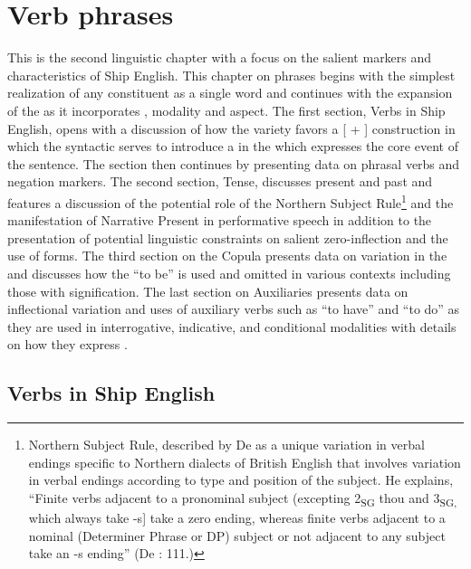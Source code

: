 \chapter{{Verb} {phrases}}

This is the second linguistic chapter with a focus on the salient markers and characteristics of Ship English. This chapter on  phrases begins with the simplest realization of any  constituent as a single word and continues with the expansion of the  as it incorporates , modality and aspect. The first section, Verbs in Ship English, opens with a discussion of how the variety favors a [ + ] construction in which the syntactic  serves to introduce a  in the  which expresses the core event of the sentence.  The section then continues by presenting data on phrasal verbs and negation markers. The second section, Tense, discusses present and past  and features a discussion of the potential role of the Northern Subject Rule\footnote{Northern Subject Rule, described by De \citet{Haas2006} as a unique variation in verbal endings specific to Northern dialects of British English that involves variation in verbal endings according to type and position of the subject. He explains, “Finite verbs adjacent to a pronominal subject (excepting 2\textsubscript{SG} thou and 3\textsubscript{SG,} which always take -s] take a zero ending, whereas finite verbs adjacent to a nominal (Determiner Phrase or DP) subject or not adjacent to any subject take an -s ending” (De \citealt{Haas2006}: 111.)} and the manifestation of Narrative Present in performative speech in addition to the presentation of potential linguistic constraints on salient zero-inflection and the use of  forms. The third section on the Copula presents data on variation in the  and discusses how the  “to be” is used and omitted in various contexts including those with  signification. The last section on Auxiliaries presents data on inflectional variation and uses of auxiliary verbs such as “to have” and “to do” as they are used in interrogative, indicative, and conditional modalities with details on how they express . 

\section{{Verbs} {in} {Ship} {English}}%

